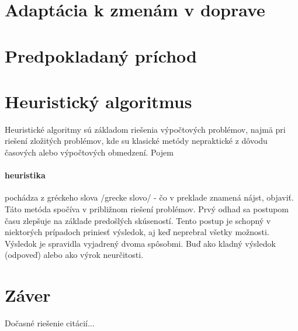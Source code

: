 \documentclass[10pt,twoside,slovak,a4paper]{article}
\begin{document}
\section{Adaptácia k zmenám v doprave}


\section{Predpokladaný príchod}
\section{Heuristický algoritmus} \label{heuristika}
Heuristické algoritmy sú základom riešenia výpočtových problémov, najmä pri riešení zložitých problémov, kde su klasické metódy nepraktické z dôvodu časových alebo výpočtových obmedzení.
Pojem \paragraph{heuristika} pochádza z gréckeho slova /grecke slovo/ - čo v preklade znamená nájst, objaviť. Táto metóda spočíva v približnom riešení problémov. Prvý odhad sa postupom času zlepšuje na základe predošlých skúseností. Tento postup je schopný v niektorých prípadoch priniesť výsledok, aj keď neprebral všetky možnosti. Výsledok je spravidla vyjadrený dvoma spôsobmi. Buď ako kladný výsledok (odpoveď) alebo ako výrok neurčitosti.



\section{Záver} \label{zaver} %
\cite{Heuristika}
\cite{AI-and-traffic}
\cite{Djikstra's}
\cite{Algoritmy}
\cite{Heuristika2}
\cite{Algoritmy2}

Dočasné riešenie citácií...





\end{document}
